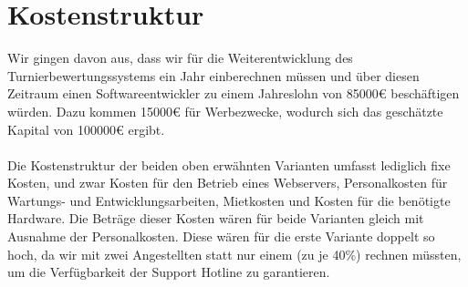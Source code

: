 \section{Kostenstruktur}
Wir gingen davon aus, dass wir für die Weiterentwicklung des Turnierbewertungssystems ein Jahr einberechnen müssen und über
    diesen Zeitraum einen Softwareentwickler zu einem Jahreslohn von 85000€ beschäftigen würden.
Dazu kommen 15000€ für Werbezwecke, wodurch sich das geschätzte Kapital von 100000€ ergibt.
\\\\
Die Kostenstruktur der beiden oben erwähnten Varianten umfasst lediglich fixe Kosten, und zwar Kosten für den Betrieb
    eines Webservers, Personalkosten für Wartungs- und Entwicklungsarbeiten, Mietkosten und Kosten für die benötigte Hardware.
Die Beträge dieser Kosten wären für beide Varianten gleich mit Ausnahme der Personalkosten.
Diese wären für die erste Variante doppelt so hoch, da wir mit zwei Angestellten statt nur einem (zu je 40\%) rechnen
    müssten, um die Verfügbarkeit der Support Hotline zu garantieren.

